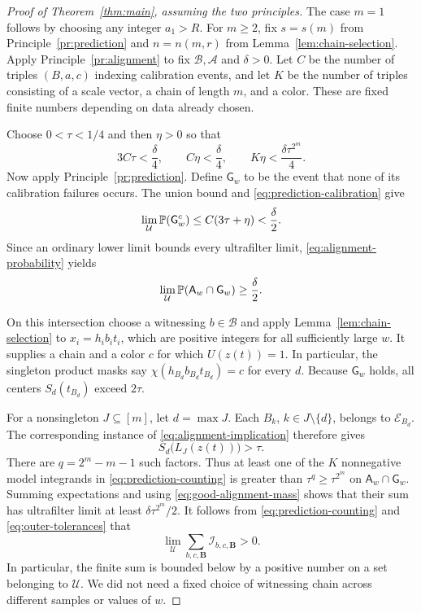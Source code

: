 \begin{proof}[Proof of Theorem~\ref{thm:main}, assuming the two principles]
The case $m=1$ follows by choosing any integer $a_1>R$.
For $m\ge2$, fix $s=s(m)$ from
Principle~\ref{pr:prediction} and $n=n(m,r)$ from
Lemma~\ref{lem:chain-selection}. Apply Principle~\ref{pr:alignment}
to fix $\mathcal B,\mathcal A$ and $\delta>0$.
Let $C$ be the number of triples $(B,a,c)$ indexing calibration
events, and let $K$ be the number of triples consisting of a scale
vector, a chain of length $m$, and a color. These are fixed finite
numbers depending on data already chosen.

Choose $0<\tau<1/4$ and then $\eta>0$ so that
\begin{equation}\label{eq:outer-tolerances}
 3C\tau<\frac\delta4,\qquad
 C\eta<\frac\delta4,\qquad
 K\eta<\frac{\delta\tau^{2^m}}4.
\end{equation}
Now apply Principle~\ref{pr:prediction}. Define $\mathsf G_w$ to
be the event that none of its calibration failures occurs. The
union bound and \eqref{eq:prediction-calibration} give
\[
 \lim_{\mathcal U}\mathbb P(\mathsf G_w^c)
 \le C(3\tau+\eta)<\frac\delta2.
\]
Since an ordinary lower limit bounds every ultrafilter limit,
\eqref{eq:alignment-probability} yields
\begin{equation}\label{eq:good-alignment-mass}
 \lim_{\mathcal U}\mathbb P(\mathsf A_w\cap\mathsf G_w)
 \ge\frac\delta2.
\end{equation}

On this intersection choose a witnessing $b\in\mathcal B$ and
apply Lemma~\ref{lem:chain-selection} to
$x_i=h_ib_it_i$, which are positive integers for all sufficiently
large $w$. It supplies a chain and a color $c$ for which
$U(z(t))=1$. In particular, the singleton product masks say
$\chi(h_{B_d}b_{B_d}t_{B_d})=c$ for every $d$. Because
$\mathsf G_w$ holds, all centers $S_d(t_{B_d})$ exceed $2\tau$.

For a nonsingleton $J\subseteq[m]$, let $d=\max J$. Each
$B_k$, $k\in J\setminus\{d\}$, belongs to $\mathcal E_{B_d}$.
The corresponding instance of \eqref{eq:alignment-implication}
therefore gives
\[
 S_d\bigl(L_J(z(t))\bigr)>\tau.
\]
There are $q=2^m-m-1$ such factors. Thus at least one of the $K$
nonnegative model integrands in \eqref{eq:prediction-counting}
is greater than $\tau^q\ge\tau^{2^m}$ on
$\mathsf A_w\cap\mathsf G_w$. Summing expectations and using
\eqref{eq:good-alignment-mass} shows that their sum has ultrafilter
limit at least $\delta\tau^{2^m}/2$. It follows from
\eqref{eq:prediction-counting} and \eqref{eq:outer-tolerances} that
\begin{equation}\label{eq:positive-total-count}
 \lim_{\mathcal U}
 \sum_{b,c,\mathbf B}\mathcal I_{b,c,\mathbf B}>0.
\end{equation}
In particular, the finite sum is bounded below by a positive number
on a set belonging to $\mathcal U$. We did not need a fixed
choice of witnessing chain across different samples or values of $w$.


\end{proof}
